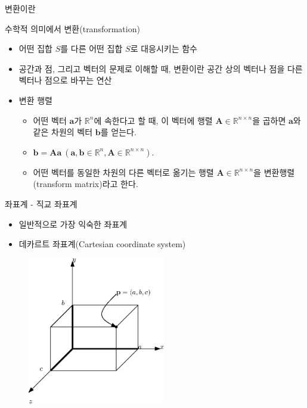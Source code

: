 \begin{frame}{변환이란}

수학적 의미에서 변환(transformation)

\begin{itemize}
\item 어떤 집합 $S$를 다른 어떤 집합 $S$로 대응시키는 함수
\item 공간과 점, 그리고 벡터의 문제로 이해할 때, 변환이란 공간 상의 벡터나 점을 다른 벡터나 점으로 바꾸는 연산
\item 변환 행렬
	\begin{itemize}
	\item 어떤 벡터 $\mathbf a$가 $\mathbb R^{n}$에 속한다고 할 때, 이 벡터에 행렬 $\mathbf A \in \mathbb R^{n \times n}$을 곱하면 $\mathbf a$와 같은 차원의 벡터 $\mathbf b$를 얻는다.
	\item $\mathbf b = \mathbf A \mathbf a ~ (\mathbf a, \mathbf b \in \mathbb R^n , \mathbf A \in \mathbb R^{n \times n})$.
	\item 어떤 벡터를 동일한 차원의 다른 벡터로 옮기는 행렬 $\mathbf A \in \mathbb R^{n \times n}$을 변환행렬(transform matrix)라고 한다.
	\end{itemize}
\end{itemize}

\end{frame}

\begin{frame}{좌표계 - 직교 좌표계}

\begin{itemize}
\item 일반적으로 가장 익숙한 좌표계
\item 데카르트 좌표계(Cartesian coordinate system)
\end{itemize}

\begin{figure}
    \includegraphics[width=6cm]{Math_transform/CartesianCoord.eps}
\end{figure}

\end{frame}

